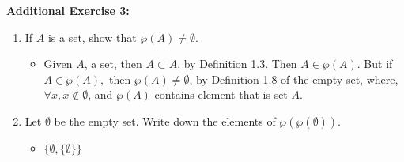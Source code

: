 \documentclass[11pt]{article}
\begin{document}
\noindent\textbf{Additional Exercise 3:} 
\begin{enumerate}
	\item If $A$ is a set, show that $\wp(A) \neq \emptyset$.
	\begin{itemize}
        \item Given $A$, a set, then $A \subset A$, by Definition 1.3. Then $A \in \wp(A).$ But if $A \in \wp(A),$ then $\wp(A) \neq \emptyset$, by Definition 1.8 of the empty set, where, $\forall x, x\notin \emptyset$, and $\wp(A)$ contains element that is set $A$.
    \end{itemize}
	\item Let $\emptyset$ be the empty set.  Write down the elements of $\wp(\wp(\emptyset)).$
	\begin{itemize}
        \item $\{\emptyset, \{\emptyset\}\}$
    \end{itemize}
\end{enumerate}
\end{document}
